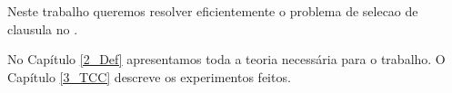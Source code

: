 
Neste trabalho queremos resolver eficientemente o problema de selecao de clausula no \ksp.


No Capítulo \ref{2_Def} apresentamos toda a teoria necessária para o trabalho. O Capítulo \ref{3_TCC} descreve os experimentos feitos.



